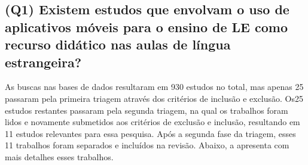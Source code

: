 \documentclass{textolivre}
\begin{document}
\subsection{(Q1) Existem estudos que envolvam o uso de aplicativos móveis para o ensino de LE como recurso didático nas aulas de língua estrangeira?}
As buscas nas bases de dados resultaram em 930 estudos no total, mas apenas 25 passaram pela primeira triagem através dos critérios de inclusão e exclusão. Os25 estudos restantes passaram pela segunda triagem, na qual os trabalhos foram lidos e novamente submetidos aos critérios de exclusão e inclusão, resultando em 11 estudos relevantes para essa pesquisa. Após a segunda fase da triagem, esses 11 trabalhos foram separados e incluídos na revisão. Abaixo, a  apresenta com mais detalhes esses trabalhos.
\end{document}
